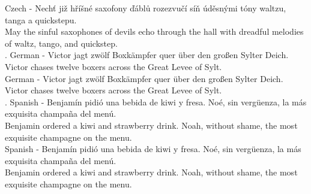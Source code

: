 \documentclass{article}
\begin{document}
\begin{tabbing}
 Czech - Nechť již hříšné saxofony ďáblů rozezvučí síň úděsnými tóny waltzu, tanga a quickstepu. \\
\> \hspace{2em} May the sinful saxophones of devils echo through the hall with dreadful melodies of waltz, tango, and quickstep. \medskip \\

\> {. German - Victor jagt zwölf Boxkämpfer quer über den großen Sylter Deich.} \\
\> \hspace{2em} {\frakfamily Victor chases twelve boxers across the Great Levee of Sylt.} \medskip \\

 German - Victor jagt zwölf Boxkämpfer quer über den großen Sylter Deich. \\
\> \hspace{2em} Victor chases twelve boxers across the Great Levee of Sylt. \medskip \\

\> {. Spanish - Benjamín pidió una bebida de kiwi y fresa. Noé, sin vergüenza, la más exquisita champaña del menú.} \\
\> \hspace{2em} {\frakfamily Benjamin ordered a kiwi and strawberry drink. Noah, without shame, the most exquisite champagne on the menu.} \medskip \\

 Spanish - Benjamín pidió una bebida de kiwi y fresa. Noé, sin vergüenza, la más exquisita champaña del menú. \\
\> \hspace{2em} Benjamin ordered a kiwi and strawberry drink. Noah, without shame, the most exquisite champagne on the menu. \medskip \\

\end{tabbing}
\end{document}
